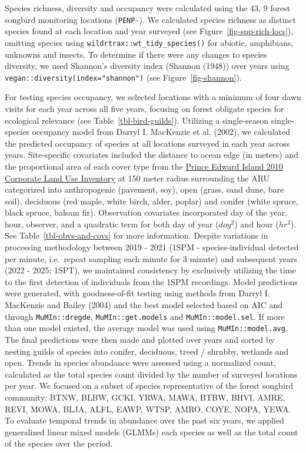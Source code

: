 \documentclass[
  letterpaper,
  DIV=11,
  numbers=noendperiod]{scrartcl}
\begin{document}
Species richness, diversity and occupancy were calculated using the 43,
9 forest songbird monitoring locations (\texttt{PENP-}). We calculated
species richness as distinct species found at each location and year
surveyed (see Figure~\ref{fig-spp-rich-locs}), omitting species using
\texttt{wildrtrax::wt\_tidy\_species()} for abiotic, amphibians,
unknowns and insects. To determine if there were any changes to species
diversity, we used Shannon's diversity index (Shannon (1948)) over years
using \texttt{vegan::diversity(index="shannon")} (see
Figure~\ref{fig-shannon}).

For testing species occupancy, we selected locations with a minimum of
four dawn visits for each year across all five years, focusing on forest
obligate species for ecological relevance (see
Table~\ref{tbl-bird-guilds}). Utilizing a single-season single-species
occupancy model from Darryl I. MacKenzie et al. (2002), we calculated
the predicted occupancy of species at all locations surveyed in each
year across years. Site-specific covariates included the distance to
ocean edge (in meters) and the proportional area of each cover type from
the
\href{https://data.princeedwardisland.ca/Environment-and-Food/OD0144-Corporate-Landuse-Inventory-2010/tc7z-7rpy}{Prince
Edward Island 2010 Corporate Land Use Inventory} at 150 meter radius
surrounding the ARU categorized into anthropogenic (pavement, soy), open
(grass, sand dune, bare soil), deciduous (red maple, white birch, alder,
poplar) and conifer (white spruce, black spruce, balsam fir).
Observation covariates incorporated day of the year, hour, observer, and
a quadratic term for both day of year (\(doy^{2}\)) and hour
(\(hr^{2}\)). See Table~\ref{tbl-obvs-and-covs} for more information.
Despite variations in processing methodology between 2019 - 2021 (1SPM -
species-individual detected per minute, i.e.~repeat sampling each minute
for 3 minute) and subsequent years (2022 - 2025; 1SPT), we maintained
consistency by exclusively utilizing the time to the first detection of
individuals from the 1SPM recordings. Model predictions were generated,
with goodness-of-fit testing using methods from Darryl I. MacKenzie and
Bailey (2004) and the best model selected based on AIC and through
\texttt{MuMIn::dregde}, \texttt{MuMIn::get.models} and
\texttt{MuMIn::model.sel}. If more than one model existed, the average
model was used using \texttt{MuMIn::model.avg}. The final predictions
were then made and plotted over years and sorted by nesting guilds of
species into conifer, deciduous, treed / shrubby, wetlands and open.
Trends in species abundance were assessed using a normalized count,
calculated as the total species count divided by the number of surveyed
locations per year. We focused on a subset of species representative of
the forest songbird community: BTNW, BLBW, GCKI, YRWA, MAWA, BTBW, BHVI,
AMRE, REVI, MOWA, BLJA, ALFL, EAWP, WTSP, AMRO, COYE, NOPA, YEWA. To
evaluate temporal trends in abundance over the past six years, we
applied generalized linear mixed models (GLMMs) each species as well as
the total count of the species over the period.
\end{document}

